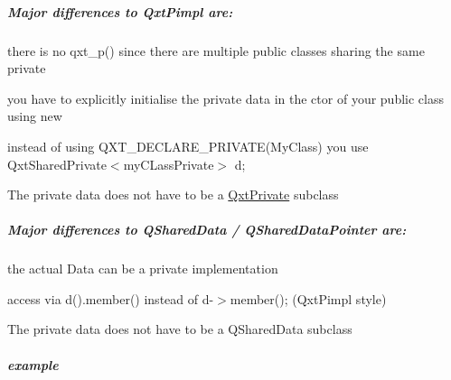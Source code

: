 \subparagraph*{Major differences to Qxt\-Pimpl are\-:}


\begin{DoxyItemize}
\item there is no qxt\-\_\-p() since there are multiple public classes sharing the same private
\item you have to explicitly initialise the private data in the ctor of your public class using new
\item instead of using Q\-X\-T\-\_\-\-D\-E\-C\-L\-A\-R\-E\-\_\-\-P\-R\-I\-V\-A\-T\-E(\-My\-Class) you use Qxt\-Shared\-Private$<$my\-C\-Lass\-Private$>$ d;
\item The private data does not have to be a \hyperlink{class_qxt_private}{Qxt\-Private} subclass
\end{DoxyItemize}

\subparagraph*{Major differences to Q\-Shared\-Data / Q\-Shared\-Data\-Pointer are\-:}


\begin{DoxyItemize}
\item the actual Data can be a private implementation
\item access via d().member() instead of d-\/$>$member(); (Qxt\-Pimpl style)
\item The private data does not have to be a Q\-Shared\-Data subclass
\end{DoxyItemize}

\subparagraph*{example}

